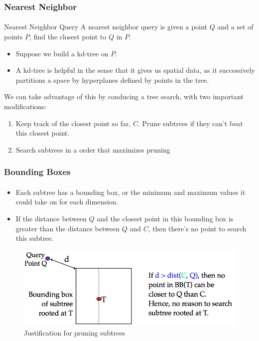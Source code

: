 \documentclass{beamer}                             %
\begin{document}
\begin{frame}
\frametitle{Nearest Neighbor}
\framesubtitle{}
\begin{block}{Nearest Neighbor Query}
  A \alert{nearest neighbor query} is given a point \( Q \) and a set of points
  \( P \), find the closest point to \( Q \) in \( P \). \pause
\end{block}
\begin{itemize}
  \item Suppose we build a kd-tree on \( P \).  
  \item A kd-tree is helpful in the sense that it gives
    us spatial data, as it successively partitions a space
    by hyperplanes defined by points in the tree. \pause
\end{itemize}

We can take advantage of this by conducing a tree search,
with two important modifications:
\begin{enumerate}
  \item Keep track of the closest point so far, \( C \).
    Prune subtrees if they can't beat this closest point.
  \item Search subtrees in a order that maximizes pruning
\end{enumerate}
\end{frame}

\begin{frame}
\frametitle{Bounding Boxes}
\framesubtitle{}
\begin{itemize}
  \item Each subtree has a \alert{bounding box}, or the minimum
    and maximum values it could take on for each dimension.
  \item If the distance between \( Q \) and the closest point in
    this bounding box is greater than the distance between \( Q \)
    and \( C \), then there's no point to search this subtree.
\end{itemize}
\begin{figure}[h!]
  \centering
  \includegraphics[scale=0.38]{nearest_neighbor_query.png}
  \caption{Justification for pruning subtrees}
\end{figure}
\end{frame}
\end{document}
